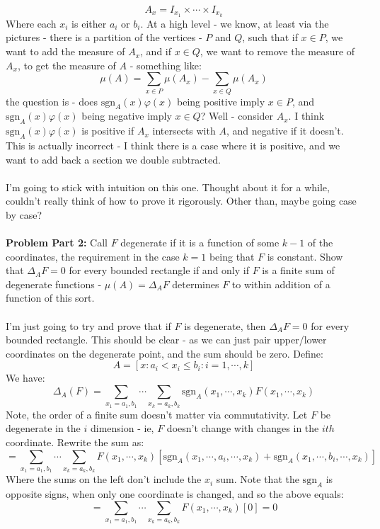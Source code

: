 \documentclass[12pt,a4paper]{article}
\newcommand{\1}[1]{\mathbbm{1}\left\{ #1 \right\}}
\newcommand{\sgn}{\text{sgn}}
\begin{document}
$$
	A_x = I_{x_1} \times \cdots \times I_{x_k}
$$
Where each $x_i$ is either $a_i$ or $b_i$. At a high level - we know, at least via the pictures - there is a partition of the vertices - $P$ and $Q$, such that if $x \in P$, we want to add the measure of $A_x$, and if $x \in Q$, we want to remove the measure of $A_x$, to get the measure of $A$ - something like:
$$
	\mu(A) = \sum_{x \in P} \mu(A_x) - \sum_{x \in Q} \mu(A_x)
$$
the question is - does $\sgn_A(x) \varphi(x)$ being positive imply $x \in P$, and $\sgn_A(x) \varphi(x)$ being negative imply $x \in Q$? Well - consider $A_x$. I think $\sgn_A(x) \varphi(x)$ is positive if $A_x$ intersects with $A$, and negative if it doesn't. This is actually incorrect - I think there is a case where it is positive, and we want to add back a section we double subtracted.
\\\\
I'm going to stick with intuition on this one. Thought about it for a while, couldn't really think of how to prove it rigorously. Other than, maybe going case by case?
\\\\
\textbf{Problem Part 2:} Call $F$ degenerate if it is a function of some $k-1$ of the coordinates, the requirement in the case $k = 1$ being that $F$ is constant. Show that $\Delta_A F = 0$ for every bounded rectangle if and only if $F$ is a finite sum of degenerate functions - $\mu(A) = \Delta_AF$ determines $F$ to within addition of a function of this sort.
\\\\
I'm just going to try and prove that if $F$ is degenerate, then $\Delta_A F = 0$ for every bounded rectangle. This should be clear - as we can just pair upper/lower coordinates on the degenerate point, and the sum should be zero. Define:
$$
	A = \left[x: a_i < x_i \leq b_i : i = 1, \cdots, k\right]
$$
We have:
$$
	\Delta_A(F) = \sum_{x_1 = a_1,b_1} \cdots \sum_{x_k = a_k,b_k} \sgn_A(x_1, \cdots, x_k) F(x_1, \cdots, x_k)
$$
Note, the order of a finite sum doesn't matter via commutativity. Let $F$ be degenerate in the $i$ dimension - ie, $F$ doesn't change with changes in the $ith$ coordinate. Rewrite the sum as:
$$
	= \sum_{x_1 = a_1,b_1} \cdots \sum_{x_k = a_k,b_k} 
	F(x_1, \cdots, x_k) \left[\sgn_A(x_1, \cdots, a_i, \cdots, x_k) + \sgn_A(x_1, \cdots, b_i, \cdots, x_k)\right]
$$
Where the sums on the left don't include the $x_i$ sum. Note that the $\sgn_A$ is opposite signs, when only one coordinate is changed, and so the above equals:
$$
	= \sum_{x_1 = a_1,b_1} \cdots \sum_{x_k = a_k,b_k} 
	F(x_1, \cdots, x_k) \left[0\right] = 0
$$
\end{document}

